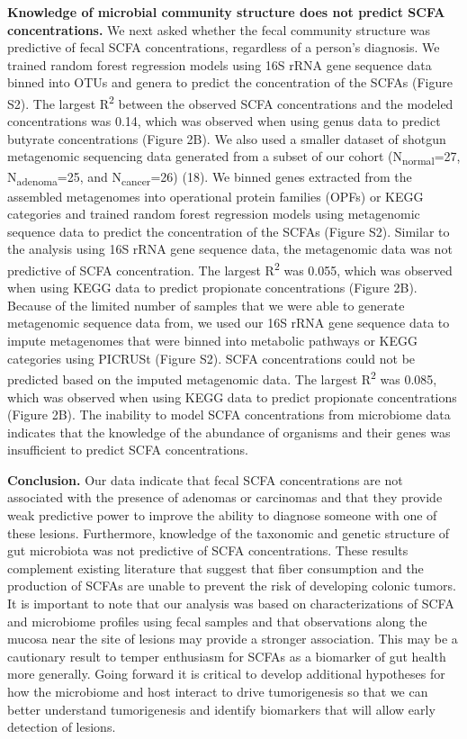 \documentclass[11pt,]{article}
\begin{document}
\textbf{Knowledge of microbial community structure does not predict SCFA
concentrations.} We next asked whether the fecal community structure was
predictive of fecal SCFA concentrations, regardless of a person's
diagnosis. We trained random forest regression models using 16S rRNA
gene sequence data binned into OTUs and genera to predict the
concentration of the SCFAs (Figure S2). The largest R\textsuperscript{2}
between the observed SCFA concentrations and the modeled concentrations
was 0.14, which was observed when using genus data to predict butyrate
concentrations (Figure 2B). We also used a smaller dataset of shotgun
metagenomic sequencing data generated from a subset of our cohort
(N\textsubscript{normal}=27, N\textsubscript{adenoma}=25, and
N\textsubscript{cancer}=26) (18). We binned genes extracted from the
assembled metagenomes into operational protein families (OPFs) or KEGG
categories and trained random forest regression models using metagenomic
sequence data to predict the concentration of the SCFAs (Figure S2).
Similar to the analysis using 16S rRNA gene sequence data, the
metagenomic data was not predictive of SCFA concentration. The largest
R\textsuperscript{2} was 0.055, which was observed when using KEGG data
to predict propionate concentrations (Figure 2B). Because of the limited
number of samples that we were able to generate metagenomic sequence
data from, we used our 16S rRNA gene sequence data to impute metagenomes
that were binned into metabolic pathways or KEGG categories using
PICRUSt (Figure S2). SCFA concentrations could not be predicted based on
the imputed metagenomic data. The largest R\textsuperscript{2} was
0.085, which was observed when using KEGG data to predict propionate
concentrations (Figure 2B). The inability to model SCFA concentrations
from microbiome data indicates that the knowledge of the abundance of
organisms and their genes was insufficient to predict SCFA
concentrations.

\textbf{Conclusion.} Our data indicate that fecal SCFA concentrations
are not associated with the presence of adenomas or carcinomas and that
they provide weak predictive power to improve the ability to diagnose
someone with one of these lesions. Furthermore, knowledge of the
taxonomic and genetic structure of gut microbiota was not predictive of
SCFA concentrations. These results complement existing literature that
suggest that fiber consumption and the production of SCFAs are unable to
prevent the risk of developing colonic tumors. It is important to note
that our analysis was based on characterizations of SCFA and microbiome
profiles using fecal samples and that observations along the mucosa near
the site of lesions may provide a stronger association. This may be a
cautionary result to temper enthusiasm for SCFAs as a biomarker of gut
health more generally. Going forward it is critical to develop
additional hypotheses for how the microbiome and host interact to drive
tumorigenesis so that we can better understand tumorigenesis and
identify biomarkers that will allow early detection of lesions.
\end{document}
